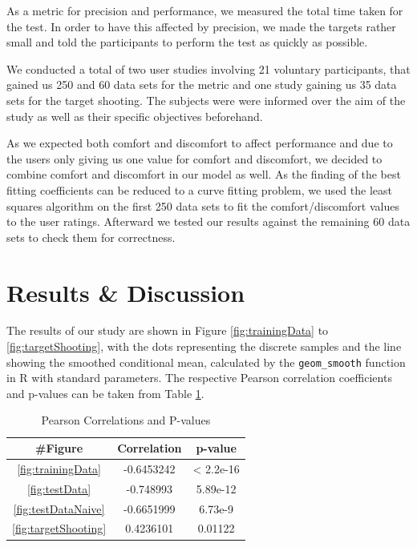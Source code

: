 \documentclass{sig-alternate-05-2015}
\begin{document}
As a metric for precision and performance, we measured the total time taken for the test. In order to have this affected by precision, we made the targets rather small and told the participants to perform the test as quickly as possible.

We conducted a total of two user studies involving 21 voluntary participants, that gained us 250 and 60 data sets for the metric and one study gaining us 35 data sets for the target shooting.
The subjects were were informed over the aim of the study as well as their specific objectives beforehand.

As we expected both comfort and discomfort to affect performance and due to the users only giving us one value for comfort and discomfort, we decided to combine comfort and discomfort in our model as well. As the finding of the best fitting coefficients can be reduced to a curve fitting problem, we used the least squares algorithm on the first 250 data sets to fit the comfort/discomfort values to the user ratings. Afterward we tested our results against the remaining 60 data sets to check them for correctness. 

\section{Results \& Discussion}

The results of our study are shown in Figure \ref{fig:trainingData} to \ref{fig:targetShooting}, with the dots representing the discrete samples and the line showing the smoothed conditional mean, calculated by the \texttt{geom\_smooth} function in R with standard parameters. The respective Pearson correlation coefficients and p-values can be taken from Table \ref{tab:correlations}.


\begin{table}[b]
\centering
\begin{tabular}{|c|c|c|} \hline
\#Figure & Correlation & p-value\\ \hline
\ref{fig:trainingData} & -0.6453242 & < 2.2e-16\\ \hline
\ref{fig:testData} & -0.748993 & 5.89e-12\\ \hline
\ref{fig:testDataNaive} & -0.6651999 & 6.73e-9\\ \hline
\ref{fig:targetShooting} & 0.4236101 & 0.01122\\ \hline
\end{tabular}
\caption{Pearson Correlations and P-values}
\label{tab:correlations}
\end{table}
\end{document}
